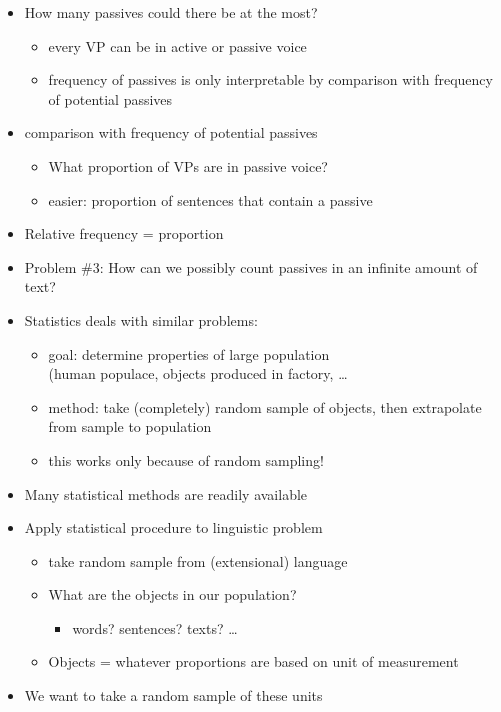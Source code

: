 \documentclass[a4paper,landscape,headrule,footrule,dvips]{foils}
\begin{document}
\begin{CJK}{UTF8}{min}
\begin{itemize}
\item How many passives could there be at the most?
\begin{itemize}
\item every VP can be in active or passive voice
\item frequency of passives is only interpretable by
comparison with frequency of potential passives
\end{itemize}
\item comparison with frequency of potential passives
\begin{itemize}
\item What proportion of VPs are in passive voice?
\item easier: proportion of sentences that contain a passive
\end{itemize}
\item Relative frequency = proportion \txx{$\mathbf{\pi}$}
\end{itemize}


\begin{itemize}
\item Problem \#3: How can we possibly count
passives in an infinite amount of text?
\item Statistics deals with similar problems:
\begin{itemize}
\item goal: determine properties of large population
\\(human populace, objects produced in factory, \ldots
\item method: take (completely) random sample of
objects, then extrapolate from sample to population
\item this works only because of random sampling!
\end{itemize}
\item Many statistical methods are readily available
\end{itemize}


\begin{itemize}
\item Apply statistical procedure to linguistic problem
  \begin{itemize}
  \item take random sample from (extensional) language
  \item What are the objects in our population?
    \begin{itemize}
    \item words? sentences? texts? …
    \end{itemize}
  \item Objects = whatever proportions are based on
    \into unit of measurement
  \end{itemize}
\item We want to take a random sample of these units
\end{itemize}


\end{CJK}
\end{document}
